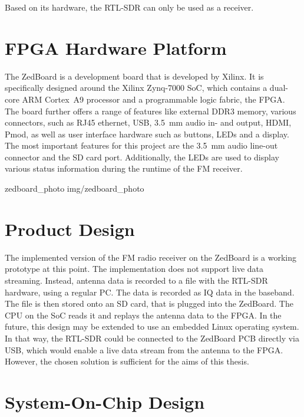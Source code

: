 \noindent
Based on its hardware, the RTL-SDR can only be used as a receiver.


\section{FPGA Hardware Platform}

The ZedBoard is a development board that is developed by Xilinx.
It is specifically designed around the Xilinx Zynq-7000 SoC, which contains a dual-core ARM Cortex~A9 processor and a programmable logic fabric, the FPGA.
The board further offers a range of features like external DDR3 memory, various connectors, such as RJ45 ethernet, USB, 3.5~mm audio in- and output, HDMI, Pmod, as well as user interface hardware such as buttons, LEDs and a display.\\

The most important features for this project are the 3.5~mm audio line-out connector and the SD card port.
Additionally, the LEDs are used to display various status information during the runtime of the FM receiver.

 {zedboard_photo} {img/zedboard_photo}

\section{Product Design}

The implemented version of the FM radio receiver on the ZedBoard is a working prototype at this point.
The implementation does not support live data streaming.
Instead, antenna data is recorded to a file with the RTL-SDR hardware, using a regular PC.
The data is recorded as IQ data in the baseband.
The file is then stored onto an SD card, that is plugged into the ZedBoard.
The CPU on the SoC reads it and replays the antenna data to the FPGA.
In the future, this design may be extended to use an embedded Linux operating system.
In that way, the RTL-SDR could be connected to the ZedBoard PCB directly via USB, which would enable a live data stream from the antenna to the FPGA.
However, the chosen solution is sufficient for the aims of this thesis.

\section{System-On-Chip Design}

